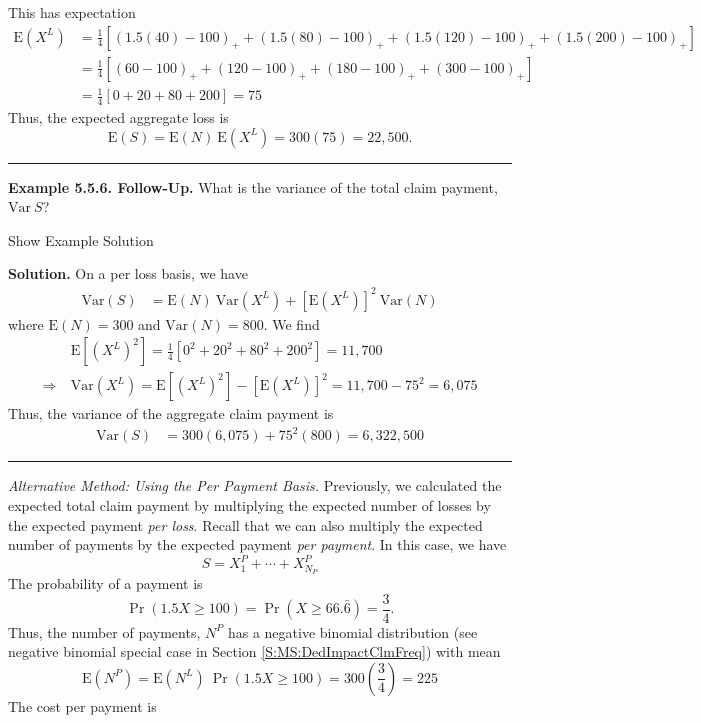 \documentclass[]{book}
\theoremstyle{definition}
\theoremstyle{definition}
\theoremstyle{definition}
\theoremstyle{remark}
\begin{document}
This has expectation \[\begin{aligned}
\mathrm{E}(X^L) &= \frac{1}{4} \left[ \left(1.5(40)-100\right)_+ +
\left(1.5(80)-100\right)_+ + \left(1.5(120)-100\right)_+ +
\left(1.5(200)-100\right)_+ \right]  \\
&= \frac{1}{4}\left[ (60-100)_+ + (120-100)_+ + (180-100)_+ + (300-100)_+\right] \\
&= \frac{1}{4}\left[ 0 + 20 + 80 + 200 \right] = 75
\end{aligned}\] Thus, the expected aggregate loss is
\[\mathrm{E}(S)=\mathrm{E}(N) ~ \mathrm{E} \left(X^L \right)= 300 (75) = 22,500
.\]

\begin{center}\rule{0.5\linewidth}{\linethickness}\end{center}

\textbf{Example 5.5.6. Follow-Up.} What is the variance of the total
claim payment, \(\mathrm{Var~}S\)?

Show Example Solution

\hypertarget{toggleExampleAggLoss.5.6}{}
\textbf{Solution.} On a per loss basis, we have \[\begin{aligned}
\mathrm{Var}(S) &= \mathrm{E}(N) ~ \mathrm{Var}\left(  X^L \right) + \left[ \mathrm{E} \left(X^L\right) \right]^2 ~ \mathrm{Var} (N)
\end{aligned}\] where \(\mathrm{E}(N) = 300\) and
\(\mathrm{Var}(N) = 800\). We find \[\begin{aligned}
&\mathrm{E} \left[ (X^L)^2 \right] = \frac{1}{4} \left[ 0^2 + 20^2 + 80^2 + 200^2 \right] = 11,700 \\
\Rightarrow \ & \mathrm{Var}(X^L) = \mathrm{E} \left[ (X^L)^2 \right] - \left[ \mathrm{E}(X^L) \right]^2 = 11,700 - 75^2 = 6,075
\end{aligned}\] Thus, the variance of the aggregate claim payment is
\[\begin{aligned}
\mathrm{Var}(S) &= 300(6,075) + 75^2 (800) = 6,322,500
\end{aligned}\]

\begin{center}\rule{0.5\linewidth}{\linethickness}\end{center}

\emph{Alternative Method: Using the Per Payment Basis.} Previously, we
calculated the expected total claim payment by multiplying the expected
number of losses by the expected payment \emph{per loss}. Recall that we
can also multiply the expected number of payments by the expected
payment \emph{per payment}. In this case, we have
\[S=X_1^P + \cdots + X_{N_P}^P \] The probability of a payment is
\[\Pr(1.5X \ge 100)=\Pr(X \ge 66.\bar{6})=\frac{3}{4} .\] Thus, the
number of payments, \(N^P\) has a negative binomial distribution (see
negative binomial special case in Section \ref{S:MS:DedImpactClmFreq})
with mean
\[\mathrm{E}(N^P) =  \mathrm{E}(N^L)~\Pr(1.5X \geq 100) = 300 \left(\frac{3}{4} \right)=225\]
The cost per payment is
\end{document}

